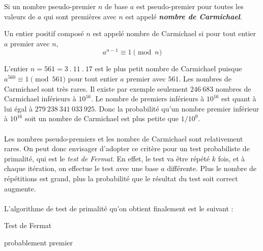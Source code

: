 \begin{itemize}
				Si un nombre pseudo-premier $n$ de base $a$ est pseudo-premier pour toutes les valeurs de $a$ qui sont premières avec $n$ est appelé \textit{\textbf{nombre de Carmichael}}. 
			
					\vspace{-1.5em}\begin{adjustwidth}{1.5cm}{1.5cm} 
					\begin{Def}
						\label{Carmich}
						Un entier positif composé $n$ est appelé nombre de Carmichael si pour tout entier $a$ premier avec $n$,
						\[a^{n-1}\equiv 1 \pmod n\]
					\end{Def}
					\end{adjustwidth}\vspace{0.5em}
					
				L'entier $n = 561 = 3\ .\ 11\ .\ 17$ est le plus petit nombre de Carmichael puisque $a^{560} \equiv 1 \pmod 561$ pour tout entier $a$ premier avec $561$. Les nombres de Carmichael sont très rares. Il existe par exemple seulement $246\ 683$ nombres de Carmichael inférieurs à $10^{16}$. Le nombre de premiers inférieurs à $10^{16}$ est quant à lui égal à $279\ 238\ 341\ 033\ 925$. Donc la probabilité qu'un nombre premier inférieur à $10^{16}$ soit un nombre de Carmichael est plus petite que $1/10^{9}$.
			
		\end{itemize}
		
		\paragraph{}Les nombres pseudo-premiers et les nombre de Carmichael sont relativement rares. On peut donc envisager d'adopter ce critère pour un test probabiliste de primalité, qui est le \textit{test de Fermat}. En effet, le test va être répété $k$ fois, et à chaque itération, on effectue le test avec une base $a$ différente. Plus le nombre de répétitions est grand, plus la probabilité que le résultat du test soit correct augmente.
		
		\paragraph{} L'algorithme de test de primalité qu'on obtient finalement est le suivant :\\
		
		\begin{algorithm}[H]
			\caption{Test de Fermat}\label{TF}
		\Retour probablement premier\;
		\end{algorithm}
		
